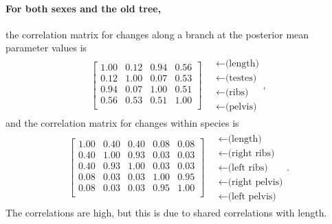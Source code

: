\documentclass{article}
\begin{document}
\paragraph{For both sexes and the old tree,} the correlation matrix for changes along a branch at the posterior mean parameter values is \\
\begin{align}
\begin{bmatrix}
   1.00 & 0.12 & 0.94 & 0.56 \\ 
   0.12 & 1.00 & 0.07 & 0.53 \\ 
   0.94 & 0.07 & 1.00 & 0.51 \\ 
   0.56 & 0.53 & 0.51 & 1.00 \\ 
 \end{bmatrix}
\quad \begin{matrix}
  \leftarrow \text{(length)} \\
  \leftarrow \text{(testes)} \\
  \leftarrow \text{(ribs)} \\
  \leftarrow \text{(pelvis)} 
\end{matrix} ,
\end{align}
and the correlation matrix for changes within species is
\begin{align}
\begin{bmatrix}
   1.00 & 0.40 & 0.40 & 0.08 & 0.08 \\ 
   0.40 & 1.00 & 0.93 & 0.03 & 0.03 \\ 
   0.40 & 0.93 & 1.00 & 0.03 & 0.03 \\ 
   0.08 & 0.03 & 0.03 & 1.00 & 0.95 \\ 
   0.08 & 0.03 & 0.03 & 0.95 & 1.00 \\ 
 \end{bmatrix}
\quad \begin{matrix}
  \leftarrow \text{(length)} \\
  \leftarrow \text{(right ribs)} \\
  \leftarrow \text{(left ribs)} \\
  \leftarrow \text{(right pelvis)} \\
  \leftarrow \text{(left pelvis)} 
\end{matrix}  .
\end{align}
The correlations are high, but this is due to shared correlations with length.
\end{document}
